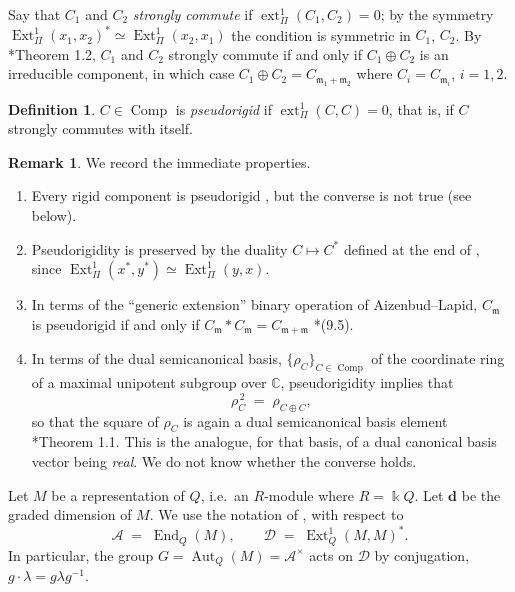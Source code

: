 \documentclass[12pt]{article}
\def\xspace{ }%
\theoremstyle{definition}
\newtheorem{definition}[definition]{Definition}
\newtheorem{remark}[remark]{Remark}
\newcommand{\prig}{pseudorigid\xspace}
\newcommand{\prigity}{pseudorigidity\xspace}
\newcommand{\Prigity}{Pseudorigidity\xspace}
\newcommand{\CC}{\mathbb{C}}
\newcommand{\bd}{\boldsymbol{d}}  %
\newcommand{\Ext}{\operatorname{Ext}}
\newcommand{\ext}{\operatorname{ext}}
\newcommand{\End}{\operatorname{End}}
\newcommand{\Aut}{\operatorname{Aut}}
\newcommand{\Comp}{\operatorname{Comp}}
\newcommand{\cmp}{C}                       %
\newcommand{\mm}{\mathfrak{m}}
\newcommand{\kk}{\Bbbk}
\newcommand{\alg}{\mathcal{A}}   %
\newcommand{\bmdl}{\mathcal{D}}   %
\begin{document}
Say that $\cmp_1$ and $\cmp_2$ \emph{strongly commute} if $\ext^1_\Pi(\cmp_1,\cmp_2) = 0$;
by the symmetry $\Ext^1_\Pi(x_1,x_2)^* \simeq \Ext^1_\Pi(x_2,x_1)$ the
condition is symmetric in $\cmp_1$, $\cmp_2$. By \cite{MR1944812}*{Theorem 1.2}, $\cmp_1$ and $\cmp_2$ strongly commute if and only
if $\cmp_1\oplus \cmp_2$ is an irreducible component, in which case $\cmp_1\oplus \cmp_2=\cmp_{\mm_1+\mm_2}$
where $\cmp_i=\cmp_{\mm_i}$, $i=1,2$.

\begin{definition}\label{def:prig}
$\cmp \in \Comp$ is \emph{\prig} if $\ext^1_\Pi(\cmp,\cmp) = 0$, that is, if $\cmp$
strongly commutes with itself.
\end{definition}

\begin{remark}\label{rem:prigbasic}
We record the immediate properties.
\begin{enumerate}
\item\label{prigbasic:rigid} Every rigid component is \prig, but the
converse is not true (see  below).
\item\label{prigbasic:dual} \Prigity is preserved by the duality $\cmp \mapsto \cmp^*$ defined at the
end of , since $\Ext^1_\Pi(x^*,y^*) \simeq
\Ext^1_\Pi(y,x)$.
\item\label{prigbasic:genext} In terms of the ``generic extension'' binary operation of Aizenbud--Lapid, $\cmp_\mm$ is \prig if and only if $\cmp_\mm * \cmp_\mm =
\cmp_{\mm+\mm}$ \cite{MR4847234}*{(9.5)}. 
\item \label{rem:semican} In terms of the dual semicanonical basis, $\{\rho_{\cmp}\}_{\cmp\in \Comp}$
of the coordinate ring of a maximal unipotent subgroup \cite{MR2144987} over $\CC$,
\prigity implies that 
\[
   \rho_{\cmp}^{\,2} \;=\; \rho_{\cmp\oplus \cmp} ,
\]
so that the square of $\rho_{\cmp}$ is again a dual semicanonical basis element \cite{MR2144987}*{Theorem 1.1}.
This is the analogue, for that basis, of a dual canonical basis vector
being \emph{real}. We do not know whether the converse holds.
\end{enumerate}
\end{remark}


Let $M$ be a representation of $Q$, i.e.\ an $R$-module where $R = \kk Q$.
Let $\bd$ be the graded dimension of $M$.
We use the notation of , with respect to
\[
   \alg \;=\; \End_Q(M),
   \qquad
   \bmdl \;=\; \Ext^1_Q(M,M)^* .
\]
In particular, the group $G = \Aut_Q(M)=\alg^\times$ acts on $\bmdl$ by conjugation, $g\cdot\lambda =g\lambda g^{-1}$.
\end{document}
